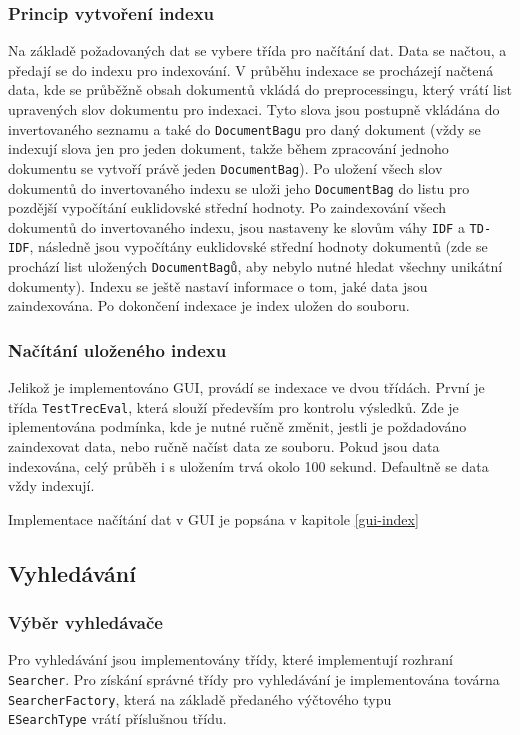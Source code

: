 \documentclass[12pt, a4paper]{article}
\begin{document}
\subsubsection{Princip vytvoření indexu}
\noindent Na základě požadovaných dat se vybere třída pro načítání dat. Data se načtou, a předají se do indexu pro indexování. V průběhu indexace se procházejí načtená data, kde se průběžně obsah dokumentů vkládá do preprocessingu, který vrátí list upravených slov dokumentu pro indexaci. Tyto slova jsou postupně vkládána do invertovaného seznamu a také do \texttt{DocumentBagu} pro daný dokument (vždy se indexují slova jen pro jeden dokument, takže během zpracování jednoho dokumentu se vytvoří právě jeden \texttt{DocumentBag}). Po uložení všech slov dokumentů do invertovaného indexu se uloži jeho \texttt{DocumentBag} do listu pro pozdější vypočítání euklidovské střední hodnoty. Po zaindexování všech dokumentů do invertovaného indexu, jsou nastaveny ke slovům váhy \texttt{IDF} a \texttt{TD-IDF}, následně jsou vypočítány euklidovské střední hodnoty dokumentů (zde se prochází list uložených \texttt{DocumentBagů}, aby nebylo nutné hledat všechny unikátní dokumenty). Indexu se ještě nastaví informace o tom, jaké data jsou zaindexována. Po dokončení indexace je index uložen do souboru.

\subsubsection{Načítání uloženého indexu}
\noindent Jelikož je implementováno GUI, provádí se indexace ve dvou třídách. První je třída \texttt{TestTrecEval}, která slouží především pro kontrolu výsledků. Zde je iplementována podmínka, kde je nutné ručně změnit, jestli je poždadováno zaindexovat data, nebo ručně načíst data ze souboru. Pokud jsou data indexována, celý průběh i s uložením trvá okolo 100 sekund. Defaultně se data vždy indexují.

Implementace načítání dat v GUI je popsána v kapitole \ref{gui-index}

\subsection{Vyhledávání}

\subsubsection{Výběr vyhledávače}
\noindent Pro vyhledávání jsou implementovány třídy, které implementují rozhraní \texttt{Searcher}. Pro získání správné třídy pro vyhledávání je implementována továrna \texttt{SearcherFactory}, která na základě předaného výčtového typu \\\texttt{ESearchType} vrátí příslušnou třídu.
\end{document}
